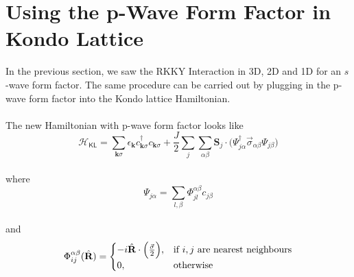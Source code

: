 \documentclass{article}
\begin{document}
\section{Using the p-Wave Form Factor in Kondo Lattice}
In the previous section, we saw the RKKY Interaction in 3D, 2D and 1D for an $s$-wave form factor. The same procedure can be carried out by plugging in the p-wave form factor into the Kondo lattice Hamiltonian. 
\\\\
The new Hamiltonian with p-wave form factor looks like
\\
\begin{equation}
\mathcal{H}_{\textsf{KL}} = \sum_{\textbf{k}\sigma} \epsilon_{\textbf{k}} c_{\textbf{k}\sigma}^\dagger c_{\textbf{k}\sigma} + \frac{J}{2} \sum_{j}\sum_{\alpha \beta} \textbf{S}_{j} \cdot \big(\Psi_{j\alpha}^\dagger \vec{\sigma}_{\alpha \beta} \Psi_{j\beta}\big)
\end{equation}
\\
where
\\
\begin{equation}
\Psi_{j\alpha} = \sum_{l, \beta} \Phi_{jl}^{\alpha \beta} c_{j \beta}
\end{equation}
\\
and
\\

\begin{equation}
 \Phi_{ij}^{\alpha \beta} (\hat{\textbf{R}}) = 
 \begin{cases}
 \centering
- i\hat{\textbf{R}} \cdot \Big( \frac{\vec{\sigma}}{2} \Big), & \text{if }i,j\text{ are nearest neighbours} \\
 0, & \text{otherwise}
\end{cases}
\end{equation}
\\
\end{document}
